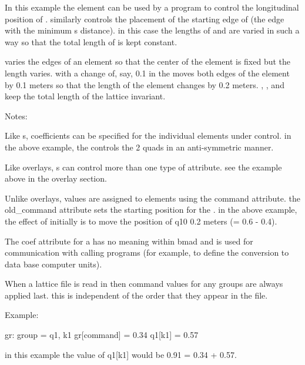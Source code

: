 In this example the  element  can be used by a program to 
control the longitudinal position of . similarly  controls the 
placement of the starting edge of  (the edge with the minimum s distance). 
in this case the lengths of  and  are varied in such a way so that the 
total length of  is kept constant. 

 varies the edges of an element so that the center of the 
element is fixed but the length varies. with  a change of, 
say, 0.1 in the  moves both edges of the element by 0.1 meters 
so that the length of the element changes by 0.2 meters. , 
,  and  keep the total length of the 
lattice invariant. 

Notes: 
\begin{Itemize}
\item	Like s, coefficients can be specified for the individual 
elements under  control. in the above example, the   
controls the 2 quads in an anti-symmetric manner. 
\item	Like overlays, s can control more than one type of attribute. 
see the example above in the overlay section. 
\item	Unlike overlays, values are assigned to  elements using the 
command attribute. the old\_command attribute sets the starting position for 
the . in the above example, the effect of  initially is to 
move the position of q10 0.2 meters (= 0.6 - 0.4). 
\item	The coef attribute for a  has no meaning within bmad and is 
used for communication with calling programs (for example, to define the 
conversion to data base computer units). 
\item	When a lattice file is read in then command values for any groups are 
always applied last. this is independent of the order that they appear in the file. 
\end{Itemize}
Example:
\begin{example} 
  gr: group = {q1}, k1 
  gr[command] = 0.34 
  q1[k1] = 0.57
\end{example}

in this example the value of q1[k1] would be 0.91 = 0.34 + 0.57. 





